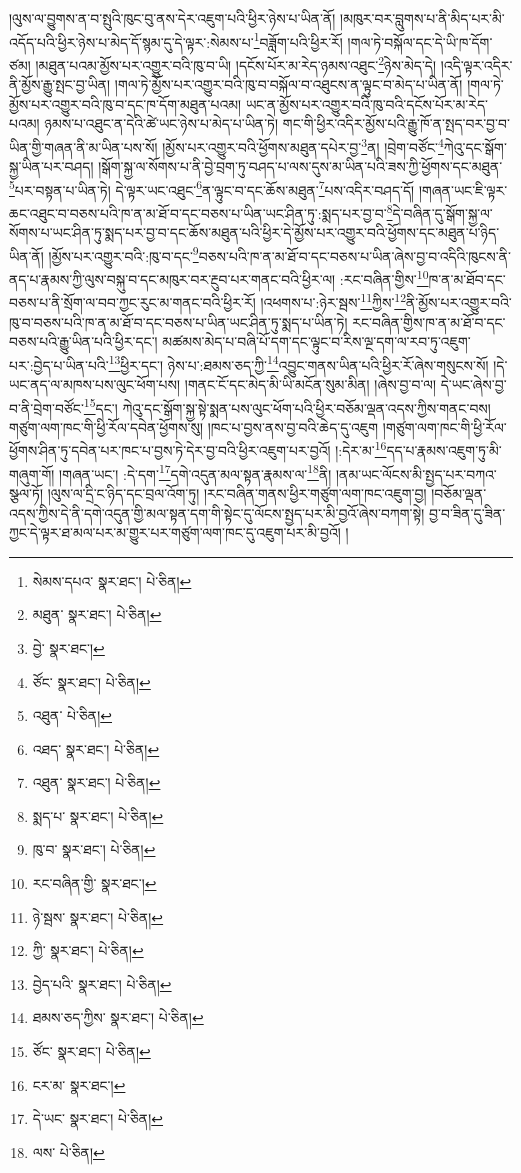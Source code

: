 །ལུས་ལ་བྱུགས་ན་བ་སྤུའི་ཁུང་བུ་ནས་དེར་འཇུག་པའི་ཕྱིར་ཉེས་པ་ཡིན་ནོ། །མཁུར་བར་བླུགས་པ་ནི་མིད་པར་མི་འདོད་པའི་ཕྱིར་ཉེས་པ་མེད་དོ་སྙམ་དུ་དེ་ལྟར་:སེམས་པ་\footnote{སེམས་དཔའ་  སྣར་ཐང་།  པེ་ཅིན། }བཟློག་པའི་ཕྱིར་རོ། །གལ་ཏེ་བསྐོལ་དང་དེ་ཡི་ཁ་དོག་ཙམ། །མཐུན་པའམ་མྱོས་པར་འགྱུར་བའི་ཁུ་བ་ཡི། །དངོས་པོར་མ་རེད་ཉམས་འཐུང་\footnote{མཐུན་  སྣར་ཐང་།  པེ་ཅིན། }ཉེས་མེད་དེ། །འདི་ལྟར་འདིར་ནི་མྱོས་རྒྱུ་སྤང་བྱ་ཡིན། །གལ་ཏེ་མྱོས་པར་འགྱུར་བའི་ཁུ་བ་བསྐོལ་བ་འཐུངས་ན་ལྟུང་བ་མེད་པ་ཡིན་ནོ། །གལ་ཏེ་མྱོས་པར་འགྱུར་བའི་ཁུ་བ་དང་ཁ་དོག་མཐུན་པའམ། ཡང་ན་མྱོས་པར་འགྱུར་བའི་ཁུ་བའི་དངོས་པོར་མ་རེད་པའམ། ཉམས་པ་འཐུང་ན་དེའི་ཚེ་ཡང་ཉེས་པ་མེད་པ་ཡིན་ཏེ། གང་གི་ཕྱིར་འདིར་མྱོས་པའི་རྒྱུ་ཁོ་ན་སྤད་བར་བྱ་བ་ཡིན་གྱི་གཞན་ནི་མ་ཡིན་པས་སོ། །མྱོས་པར་འགྱུར་བའི་ཕྱོགས་མཐུན་དཔེར་བྱ་\footnote{བྱེ་  སྣར་ཐང་། }ན། །བྲེག་བཙོང་\footnote{ཙོང་  སྣར་ཐང་།  པེ་ཅིན། }ཀེའུ་དང་སྒོག་སྐྱ་ཡིན་པར་བཤད། །སྒོག་སྐྱ་ལ་སོགས་པ་ནི་བྱེ་བྲག་ཏུ་བཤད་པ་ལས་དུས་མ་ཡིན་པའི་ཟས་ཀྱི་ཕྱོགས་དང་མཐུན་\footnote{འཐུན་  པེ་ཅིན། }པར་བསྟན་པ་ཡིན་ཏེ། དེ་ལྟར་ཡང་འཐུང་\footnote{འཐད་  སྣར་ཐང་།  པེ་ཅིན། }ན་ལྟུང་བ་དང་ཆོས་མཐུན་\footnote{འཐུན་  སྣར་ཐང་།  པེ་ཅིན། }པས་འདིར་བཤད་དོ། །གཞན་ཡང་ཇི་ལྟར་ཆང་འཐུང་བ་བཅས་པའི་ཁ་ན་མ་ཐོ་བ་དང་བཅས་པ་ཡིན་ཡང་ཤིན་ཏུ་:སྨད་པར་བྱ་བ་\footnote{སྨད་པ་  སྣར་ཐང་།  པེ་ཅིན། }དེ་བཞིན་དུ་སྒོག་སྐྱ་ལ་སོགས་པ་ཡང་ཤིན་ཏུ་སྨད་པར་བྱ་བ་དང་ཆོས་མཐུན་པའི་ཕྱིར་དེ་མྱོས་པར་འགྱུར་བའི་ཕྱོགས་དང་མཐུན་པ་ཉིད་ཡིན་ནོ། །མྱོས་པར་འགྱུར་བའི་:ཁུ་བ་དང་\footnote{ཁུ་བ་  སྣར་ཐང་།  པེ་ཅིན། }བཅས་པའི་ཁ་ན་མ་ཐོ་བ་དང་བཅས་པ་ཡིན་ཞེས་བྱ་བ་འདིའི་ཁུངས་ནི་ནད་པ་རྣམས་ཀྱི་ལུས་བསྐུ་བ་དང་མཁུར་བར་རྔུབ་པར་གནང་བའི་ཕྱིར་ལ། :རང་བཞིན་གྱིས་\footnote{རང་བཞིན་གྱི་  སྣར་ཐང་། }ཁ་ན་མ་ཐོབ་དང་བཅས་པ་ནི་སྲོག་ལ་བབ་ཀྱང་རུང་མ་གནང་བའི་ཕྱིར་རོ། །འཕགས་པ་:ཉེར་སྦས་\footnote{ཉེ་སྦས་  སྣར་ཐང་།  པེ་ཅིན། }ཀྱིས་\footnote{ཀྱི་  སྣར་ཐང་།  པེ་ཅིན། }ནི་མྱོས་པར་འགྱུར་བའི་ཁུ་བ་བཅས་པའི་ཁ་ན་མ་ཐོ་བ་དང་བཅས་པ་ཡིན་ཡང་ཤིན་ཏུ་སྨད་པ་ཡིན་ཏེ། རང་བཞིན་གྱིས་ཁ་ན་མ་ཐོ་བ་དང་བཅས་པའི་རྒྱུ་ཡིན་པའི་ཕྱིར་དང་། མཚམས་མེད་པ་བཞི་པོ་དག་དང་ལྟུང་བ་རིས་ལྔ་དག་ལ་རབ་ཏུ་འཇུག་པར་:བྱེད་པ་ཡིན་པའི་\footnote{བྱེད་པའི་  སྣར་ཐང་།  པེ་ཅིན། }ཕྱིར་དང་། ཉེས་པ་:ཐམས་ཅད་ཀྱི་\footnote{ཐམས་ཅད་ཀྱིས་  སྣར་ཐང་།  པེ་ཅིན། }འབྱུང་གནས་ཡིན་པའི་ཕྱིར་རོ་ཞེས་གསུངས་སོ། །དེ་ཡང་ནད་ལ་མཁས་པས་ལུང་ཕོག་པས། །གནང་ངོ་དང་མེད་མི་ཡི་མངོན་སུམ་མིན། །ཞེས་བྱ་བ་ལ། དེ་ཡང་ཞེས་བྱ་བ་ནི་བྲེག་བཙོང་\footnote{ཙོང་  སྣར་ཐང་།  པེ་ཅིན། }དང་། ཀེའུ་དང་སྒོག་སྐྱ་སྟེ་སྨན་པས་ལུང་ཕོག་པའི་ཕྱིར་བཅོམ་ལྡན་འདས་ཀྱིས་གནང་བས། གཙུག་ལག་ཁང་གི་ཕྱི་རོལ་དབེན་ཕྱོགས་སུ། །ཁང་པ་བྱས་ནས་བྱ་བའི་ཆེད་དུ་འཇུག །གཙུག་ལག་ཁང་གི་ཕྱི་རོལ་ཕྱོགས་ཤིན་ཏུ་དབེན་པར་ཁང་པ་བྱས་ཏེ་དེར་བྱ་བའི་ཕྱིར་འཇུག་པར་བྱའོ། །:དེར་མ་\footnote{ངར་མ་  སྣར་ཐང་། }དད་པ་རྣམས་འཇུག་ཏུ་མི་གཞུག་གོ། །གཞན་ཡང་། :དེ་དག་\footnote{དེ་ཡང་  སྣར་ཐང་།  པེ་ཅིན། }དགེ་འདུན་མལ་སྟན་རྣམས་ལ་\footnote{ལས་  པེ་ཅིན། }ནི། །ནམ་ཡང་ལོངས་མི་སྤྱད་པར་བཀའ་སྩལ་ཏོ། །ལུས་ལ་དྲི་ང་ཉིད་དང་བྲལ་འོག་ཏུ། །རང་བཞིན་གནས་ཕྱིར་གཙུག་ལག་ཁང་འཇུག་བྱ། །བཅོམ་ལྡན་འདས་ཀྱིས་དེ་ནི་དགེ་འདུན་གྱི་མལ་སྟན་དག་གི་སྟེང་དུ་ལོངས་སྤྱད་པར་མི་བྱའོ་ཞེས་བཀག་སྟེ། བྱ་བ་ཟིན་དུ་ཟིན་ཀྱང་དེ་ལྟར་ཐ་མལ་པར་མ་གྱུར་པར་གཙུག་ལག་ཁང་དུ་འཇུག་པར་མི་བྱའོ། །
